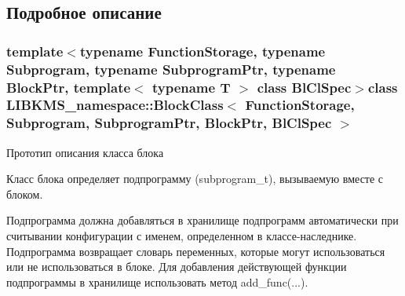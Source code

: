 \subsection{Подробное описание}
\subsubsection*{template$<$typename Function\-Storage, typename Subprogram, typename Subprogram\-Ptr, typename Block\-Ptr, template$<$ typename T $>$ class Bl\-Cl\-Spec$>$class L\-I\-B\-K\-M\-S\-\_\-namespace\-::\-Block\-Class$<$ Function\-Storage, Subprogram, Subprogram\-Ptr, Block\-Ptr, Bl\-Cl\-Spec $>$}

Прототип описания класса блока 

Класс блока определяет подпрограмму (subprogram\-\_\-t), вызываемую вместе с блоком.

Подпрограмма должна добавляться в хранилище подпрограмм автоматически при считывании конфигурации с именем, определенном в классе-\/наследнике. Подпрограмма возвращает словарь переменных, которые могут использоваться или не использоваться в блоке. Для добавления действующей функции подпрограммы в хранилище использовать метод add\-\_\-func(...). 

